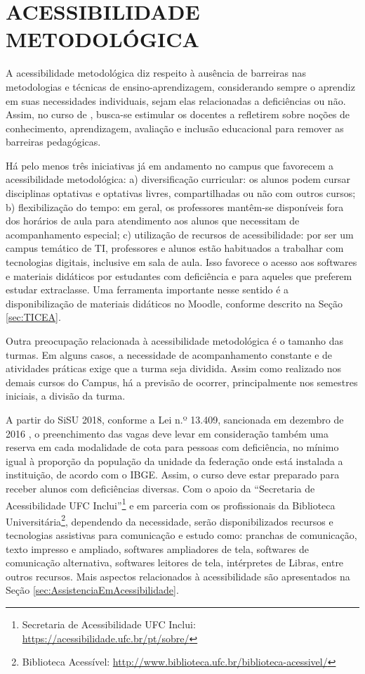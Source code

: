 \section{ACESSIBILIDADE METODOLÓGICA}
\label{sec:acessibilidade}

A acessibilidade metodológica diz respeito à ausência de barreiras nas metodologias e técnicas de ensino-aprendizagem, considerando sempre o aprendiz em suas necessidades individuais, sejam elas relacionadas a deficiências ou não. Assim, no curso de \nomedocurso, busca-se estimular os docentes a refletirem sobre noções de conhecimento, aprendizagem, avaliação e inclusão educacional para remover as barreiras pedagógicas.

Há pelo menos três iniciativas já em andamento no campus que favorecem a acessibilidade metodológica: a) diversificação curricular: os alunos podem cursar disciplinas optativas e optativas livres, compartilhadas ou não com outros cursos; b) flexibilização do tempo: em geral, os professores mantêm-se disponíveis fora dos horários de aula para atendimento aos alunos que necessitam de acompanhamento especial; c) utilização de recursos de acessibilidade: por ser um campus temático de TI, professores e alunos estão habituados a trabalhar com tecnologias digitais, inclusive em sala de aula. Isso favorece o acesso aos softwares e materiais didáticos por estudantes com deficiência e para aqueles que preferem estudar extraclasse. Uma ferramenta importante nesse sentido é a disponibilização de materiais didáticos no Moodle, conforme descrito na Seção \ref{sec:TICEA}.

Outra preocupação relacionada à acessibilidade metodológica é o tamanho das turmas. Em alguns casos, a necessidade de acompanhamento constante e de atividades práticas exige que a turma seja dividida. Assim como realizado nos demais cursos do Campus, há a previsão de ocorrer, principalmente nos semestres iniciais, a divisão da turma. %

A partir do SiSU 2018, conforme a Lei n.º 13.409, sancionada em dezembro de 2016 \cite{brasil2016lei13409}, o preenchimento das vagas deve levar em consideração também uma reserva em cada modalidade de cota para pessoas com deficiência, no mínimo igual à proporção da população da unidade da federação onde está instalada a instituição, de acordo com o IBGE. Assim, o curso deve estar preparado para receber alunos com deficiências diversas. Com o apoio da ``Secretaria de Acessibilidade UFC Inclui''\footnote{Secretaria de Acessibilidade UFC Inclui: \url{https://acessibilidade.ufc.br/pt/sobre/}} e em parceria com os profissionais da Biblioteca Universitária\footnote{Biblioteca Acessível: \url{http://www.biblioteca.ufc.br/biblioteca-acessivel/}}, dependendo da necessidade, serão disponibilizados recursos e tecnologias assistivas para comunicação e estudo como: pranchas de comunicação, texto impresso e ampliado, softwares ampliadores de tela, softwares de comunicação alternativa, softwares leitores de tela, intérpretes de Libras, entre outros recursos. Mais aspectos relacionados à acessibilidade são apresentados na Seção \ref{sec:AssistenciaEmAcessibilidade}.